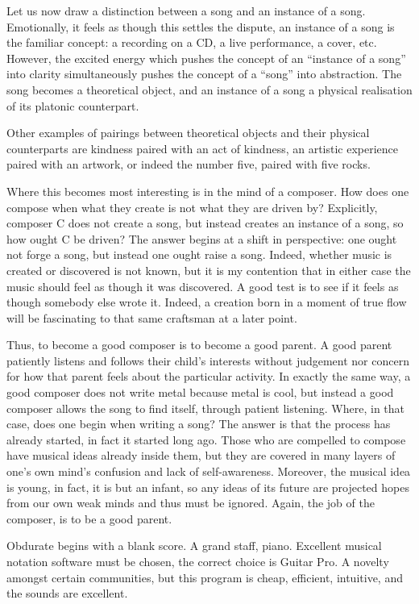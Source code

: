 \documentclass[12pt]{book}
\theoremstyle{plain}
\theoremstyle{definition}
\begin{document}
Let us now draw a distinction between a song and an instance of a song. Emotionally, it feels as though this settles the dispute, an instance of a song is the familiar concept: a recording on a CD, a live performance, a cover, etc. However, the excited energy which pushes the concept of an “instance of a song” into clarity simultaneously pushes the concept of a “song” into abstraction. The song becomes a theoretical object, and an instance of a song a physical realisation of its platonic counterpart.

Other examples of pairings between theoretical objects and their physical counterparts are kindness paired with an act of kindness, an artistic experience paired with an artwork, or indeed the number five, paired with five rocks.

Where this becomes most interesting is in the mind of a composer. How does one compose when what they create is not what they are driven by? Explicitly, composer C does not create a song, but instead creates an instance of a song, so how ought C be driven?
The answer begins at a shift in perspective: one ought not forge a song, but instead one ought raise a song. Indeed, whether music is created or discovered is not known, but it is my contention that in either case the music should feel as though it was discovered. A good test is to see if it feels as though somebody else wrote it. Indeed, a creation born in a moment of true flow will be fascinating to that same craftsman at a later point.

Thus, to become a good composer is to become a good parent. A good parent patiently listens and follows their child’s interests without judgement nor concern for how that parent feels about the particular activity. In exactly the same way, a good composer does not write metal because metal is cool, but instead a good composer allows the song to find itself, through patient listening.
Where, in that case, does one begin when writing a song? The answer is that the process has already started, in fact it started long ago. Those who are compelled to compose have musical ideas already inside them, but they are covered in many layers of one’s own mind’s confusion and lack of self-awareness. Moreover, the musical idea is young, in fact, it is but an infant, so any ideas of its future are projected hopes from our own weak minds and thus must be ignored. Again, the job of the composer, is to be a good parent.

Obdurate begins with a blank score. A grand staff, piano. Excellent musical notation software must be chosen, the correct choice is Guitar Pro. A novelty amongst certain communities, but this program is cheap, efficient, intuitive, and the sounds are excellent.
\end{document}
